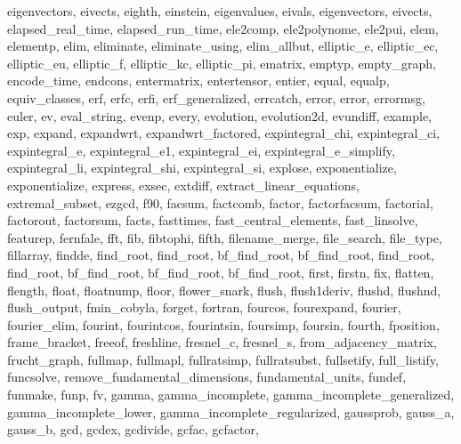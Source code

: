 {{    eigenvectors,
    eivects,
    eighth,
    einstein,
    eigenvalues,
    eivals,
    eigenvectors,
    eivects,
    elapsed_real_time,
    elapsed_run_time,
    ele2comp,
    ele2polynome,
    ele2pui,
    elem,
    elementp,
    elim,
    eliminate,
    eliminate_using,
    elim_allbut,
    elliptic_e,
    elliptic_ec,
    elliptic_eu,
    elliptic_f,
    elliptic_kc,
    elliptic_pi,
    ematrix,
    emptyp,
    empty_graph,
    encode_time,
    endcons,
    entermatrix,
    entertensor,
    entier,
    equal,
    equalp,
    equiv_classes,
    erf,
    erfc,
    erfi,
    erf_generalized,
    errcatch,
    error,
    error,
    errormsg,
    euler,
    ev,
    eval_string,
    evenp,
    every,
    evolution,
    evolution2d,
    evundiff,
    example,
    exp,
    expand,
    expandwrt,
    expandwrt_factored,
    expintegral_chi,
    expintegral_ci,
    expintegral_e,
    expintegral_e1,
    expintegral_ei,
    expintegral_e_simplify,
    expintegral_li,
    expintegral_shi,
    expintegral_si,
    explose,
    exponentialize,
    exponentialize,
    express,
    exsec,
    extdiff,
    extract_linear_equations,
    extremal_subset,
    ezgcd,
    f90,
    facsum,
    factcomb,
    factor,
    factorfacsum,
    factorial,
    factorout,
    factorsum,
    facts,
    fasttimes,
    fast_central_elements,
    fast_linsolve,
    featurep,
    fernfale,
    fft,
    fib,
    fibtophi,
    fifth,
    filename_merge,
    file_search,
    file_type,
    fillarray,
    findde,
    find_root,
    find_root,
    bf_find_root,
    bf_find_root,
    find_root,
    find_root,
    bf_find_root,
    bf_find_root,
    bf_find_root,
    first,
    firstn,
    fix,
    flatten,
    flength,
    float,
    floatnump,
    floor,
    flower_snark,
    flush,
    flush1deriv,
    flushd,
    flushnd,
    flush_output,
    fmin_cobyla,
    forget,
    fortran,
    fourcos,
    fourexpand,
    fourier,
    fourier_elim,
    fourint,
    fourintcos,
    fourintsin,
    foursimp,
    foursin,
    fourth,
    fposition,
    frame_bracket,
    freeof,
    freshline,
    fresnel_c,
    fresnel_s,
    from_adjacency_matrix,
    frucht_graph,
    fullmap,
    fullmapl,
    fullratsimp,
    fullratsubst,
    fullsetify,
    full_listify,
    funcsolve,
    remove_fundamental_dimensions,
    fundamental_units,
    fundef,
    funmake,
    funp,
    fv,
    gamma,
    gamma_incomplete,
    gamma_incomplete_generalized,
    gamma_incomplete_lower,
    gamma_incomplete_regularized,
    gaussprob,
    gauss_a,
    gauss_b,
    gcd,
    gcdex,
    gcdivide,
    gcfac,
    gcfactor,
}}
